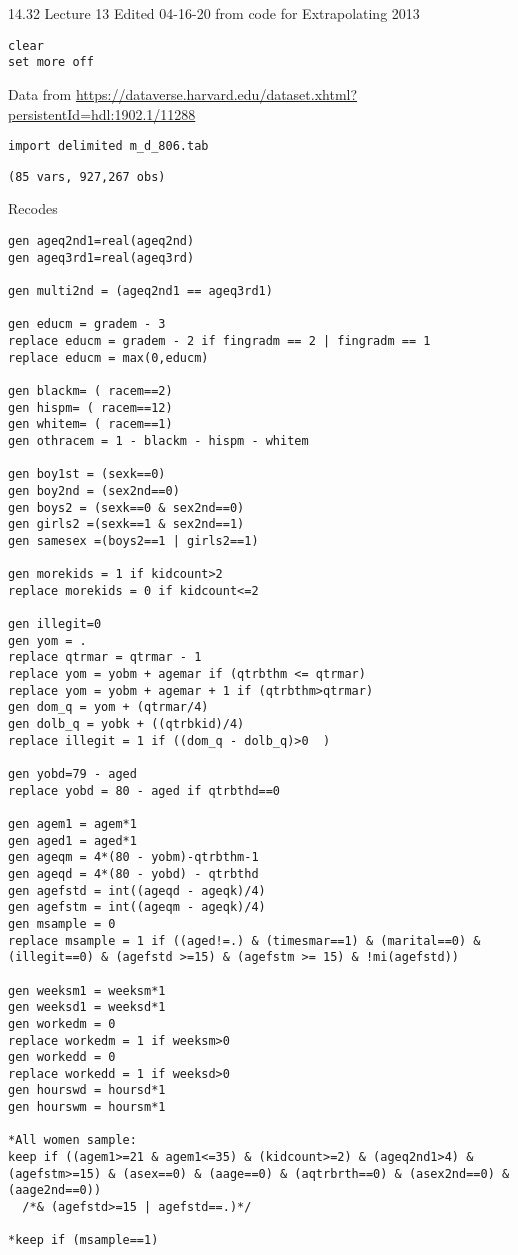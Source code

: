 \documentclass[11pt]{article}
\date{\today}
\title{}
\begin{document}
\tableofcontents

14.32 Lecture 13
Edited 04-16-20 from code for Extrapolating 2013

\begin{verbatim}
clear
set more off
\end{verbatim}

Data from \url{https://dataverse.harvard.edu/dataset.xhtml?persistentId=hdl:1902.1/11288}

\begin{verbatim}
import delimited m_d_806.tab
\end{verbatim}

\begin{verbatim}
(85 vars, 927,267 obs)
\end{verbatim}


Recodes
\begin{verbatim}
gen ageq2nd1=real(ageq2nd)
gen ageq3rd1=real(ageq3rd)

gen multi2nd = (ageq2nd1 == ageq3rd1)

gen educm = gradem - 3
replace educm = gradem - 2 if fingradm == 2 | fingradm == 1
replace educm = max(0,educm)

gen blackm= ( racem==2)
gen hispm= ( racem==12)
gen whitem= ( racem==1)
gen othracem = 1 - blackm - hispm - whitem

gen boy1st = (sexk==0)
gen boy2nd = (sex2nd==0)
gen boys2 = (sexk==0 & sex2nd==0)
gen girls2 =(sexk==1 & sex2nd==1)
gen samesex =(boys2==1 | girls2==1)

gen morekids = 1 if kidcount>2
replace morekids = 0 if kidcount<=2

gen illegit=0
gen yom = .
replace qtrmar = qtrmar - 1 
replace yom = yobm + agemar if (qtrbthm <= qtrmar) 
replace yom = yobm + agemar + 1 if (qtrbthm>qtrmar) 
gen dom_q = yom + (qtrmar/4) 
gen dolb_q = yobk + ((qtrbkid)/4) 
replace illegit = 1 if ((dom_q - dolb_q)>0	) 

gen yobd=79 - aged
replace yobd = 80 - aged if qtrbthd==0

gen agem1 = agem*1
gen aged1 = aged*1
gen ageqm = 4*(80 - yobm)-qtrbthm-1
gen ageqd = 4*(80 - yobd) - qtrbthd
gen agefstd = int((ageqd - ageqk)/4)
gen agefstm = int((ageqm - ageqk)/4)
gen msample = 0
replace msample = 1 if ((aged!=.) & (timesmar==1) & (marital==0) & (illegit==0) & (agefstd >=15) & (agefstm >= 15) & !mi(agefstd))

gen weeksm1 = weeksm*1
gen weeksd1 = weeksd*1
gen workedm = 0
replace workedm = 1 if weeksm>0
gen workedd = 0
replace workedd = 1 if weeksd>0
gen hourswd = hoursd*1
gen hourswm = hoursm*1

*All women sample:
keep if ((agem1>=21 & agem1<=35) & (kidcount>=2) & (ageq2nd1>4) & (agefstm>=15) & (asex==0) & (aage==0) & (aqtrbrth==0) & (asex2nd==0) & (aage2nd==0))
  /*& (agefstd>=15 | agefstd==.)*/

*keep if (msample==1)

\end{verbatim}
\end{document}

